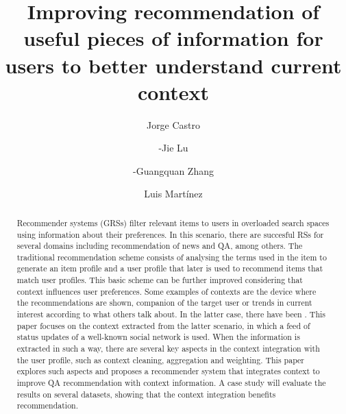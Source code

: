 \documentclass[preprint]{elsarticle}
\begin{document}
\title{Improving recommendation of useful pieces of information for users to better understand current context}

\begin{spacing}{2}

\begin{frontmatter}

\author[addressjorge,addressjie]{Jorge Castro}

\author[addressjie]{-Jie Lu}

\author[addressjie]{-Guangquan Zhang}

\author[addressluis]{Luis Mart\'inez}

\address[addressjorge]{Department of Computer Science and Artificial Intelligence, University of Granada, Granada (Spain)}
\address[addressjie]{School of Software, University of Technology Sydney, Sydney (Australia)}
\address[addressluis]{Computer Science Department, University of Ja\'en, Ja\'en (Spain)}

\begin{abstract}

Recommender systems (GRSs) filter relevant items to users in overloaded search spaces using information about their preferences. In this scenario, there are succesful RSs for several domains including recommendation of news and QA, among others. The traditional recommendation scheme consists of analysing the terms used in the item to generate an item profile and a user profile that later is used to recommend items that match user profiles. This basic scheme can be further improved considering that context influences user preferences. Some examples of contexts are the device where the recommendations are shown, companion of the target user or trends in current interest according to what others talk about. In the latter case, there have been . This paper focuses on the context extracted from the latter scenario, in which a feed of status updates of a well-known social network is used. When the information is extracted in such a way, there are several key aspects in the context integration with the user profile, such as context cleaning, aggregation and weighting. This paper explores such aspects and proposes a recommender system that integrates context to improve QA recommendation with context information. A case study will evaluate the results on several datasets, showing that the context integration benefits recommendation.


\end{abstract}
\end{frontmatter}
\end{spacing}
\end{document}
